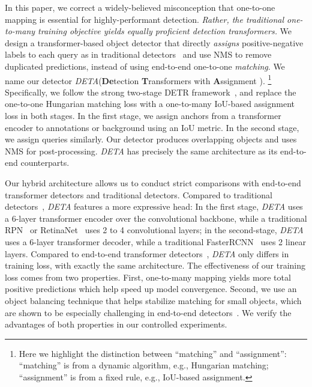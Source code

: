 \documentclass[10pt,twocolumn,letterpaper]{article}
\def\name{{\textit{DETA}}\xspace}
\def\highlighttitle{\textbf{De}tection \textbf{T}ransformers with \textbf{A}ssignment \xspace}
\begin{document}
In this paper, we correct a widely-believed misconception that one-to-one mapping is essential for highly-performant detection.
\textit{Rather, the traditional one-to-many training objective yields equally proficient detection transformers.}
We design a transformer-based object detector that directly \emph{assigns} positive-negative labels to each query as in traditional detectors~\cite{ren2015faster,lin2017focal} 
and use NMS to remove duplicated predictions, instead of using end-to-end one-to-one \emph{matching}.
We name our detector \name (\highlighttitle).
\footnote{Here we highlight the distinction between ``matching'' and ``assignment'': ``matching'' is from a dynamic algorithm, e.g., Hungarian matching; ``assignment'' is from a fixed rule, e.g., IoU-based assignment.}
Specifically, we follow the strong two-stage DETR framework~\cite{zhu2020deformable},
and replace the one-to-one Hungarian matching loss with a one-to-many IoU-based assignment loss in both stages.
In the first stage, we assign anchors from a transformer encoder to annotations or background using an IoU metric.
In the second stage, we assign queries similarly. Our detector produces overlapping objects and uses NMS for post-processing.
\name{} has precisely the same architecture as its end-to-end counterparts. 



Our hybrid architecture allows us to conduct strict comparisons with end-to-end transformer detectors and traditional detectors.
Compared to traditional detectors~\cite{ren2015faster,lin2017focal}, \name features a more expressive head:
In the first stage, \name uses a 6-layer transformer encoder over the convolutional backbone, while a traditional RPN~\cite{ren2015faster} or RetinaNet~\cite{lin2017focal} uses 2 to 4 convolutional layers;
in the second-stage, \name uses a 6-layer transformer decoder, while a traditional FasterRCNN~\cite{ren2015faster} uses 2 linear layers.
Compared to end-to-end transformer detectors~\cite{carion2020end,zhu2020deformable}, \name only differs in training loss, with exactly the same architecture.
The effectiveness of our training loss comes from two properties.
First, one-to-many mapping yields more total positive predictions which help speed up model convergence.
Second, we use an object balancing technique that helps stabilize matching for small objects, which are shown to be especially challenging in end-to-end detectors~\cite{carion2020end}.
We verify the advantages of both properties in our controlled experiments.
\end{document}

